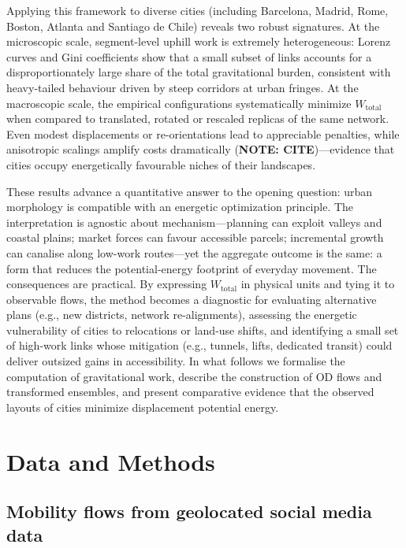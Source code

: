 \documentclass[twocolumn,amsmath,amssymb,floatfix,nature,shownopacs,footinbib,superscriptaddress]{revtex4-1} %
\begin{document}
Applying this framework to diverse cities (including Barcelona, Madrid, Rome, Boston, Atlanta and Santiago de Chile) reveals two robust signatures. At the microscopic scale, segment-level uphill work is extremely heterogeneous: Lorenz curves and Gini coefficients show that a small subset of links accounts for a disproportionately large share of the total gravitational burden, consistent with heavy-tailed behaviour driven by steep corridors at urban fringes. At the macroscopic scale, the empirical configurations systematically minimize $W_{\text{total}}$ when compared to translated, rotated or rescaled replicas of the same network. Even modest displacements or re-orientations lead to appreciable penalties, while anisotropic scalings amplify costs dramatically (\textbf{NOTE: CITE})—evidence that cities occupy energetically favourable niches of their landscapes.

These results advance a quantitative answer to the opening question: urban morphology is compatible with an energetic optimization principle. The interpretation is agnostic about mechanism—planning can exploit valleys and coastal plains; market forces can favour accessible parcels; incremental growth can canalise along low-work routes—yet the aggregate outcome is the same: a form that reduces the potential-energy footprint of everyday movement. The consequences are practical. By expressing $W_{\text{total}}$ in physical units and tying it to observable flows, the method becomes a diagnostic for evaluating alternative plans (e.g., new districts, network re-alignments), assessing the energetic vulnerability of cities to relocations or land-use shifts, and identifying a small set of high-work links whose mitigation (e.g., tunnels, lifts, dedicated transit) could deliver outsized gains in accessibility. In what follows we formalise the computation of gravitational work, describe the construction of OD flows and transformed ensembles, and present comparative evidence that the observed layouts of cities minimize displacement potential energy.


\section*{Data and Methods}
\subsection*{Mobility flows from geolocated social media data}

\label{sec:twitter-data}
\end{document}
